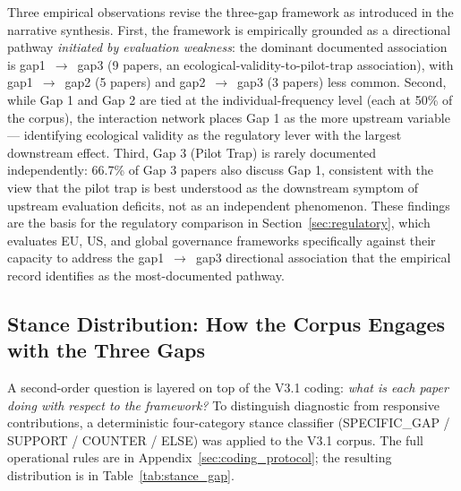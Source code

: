 Three empirical observations revise the three-gap framework as
introduced in the narrative synthesis. First, the framework is
empirically grounded as a directional pathway \textit{initiated by
evaluation weakness}: the dominant documented association is
gap1~$\rightarrow$~gap3 (9 papers, an
ecological-validity-to-pilot-trap association), with
gap1~$\rightarrow$~gap2 (5 papers) and gap2~$\rightarrow$~gap3 (3
papers) less common. Second, while Gap 1 and Gap 2 are tied at the
individual-frequency level (each at 50\% of the corpus), the
interaction network places Gap 1 as the more upstream variable ---
identifying ecological validity as the regulatory lever with the
largest downstream effect. Third, Gap 3 (Pilot Trap)
is rarely documented independently: 66.7\% of Gap 3 papers also
discuss Gap 1, consistent with the view that the pilot trap is best
understood as the downstream symptom of upstream evaluation deficits,
not as an independent phenomenon. These findings are the basis for
the regulatory comparison in Section~\ref{sec:regulatory}, which
evaluates EU, US, and global governance frameworks specifically
against their capacity to address the gap1~$\rightarrow$~gap3
directional association that the empirical record identifies as
the most-documented pathway.


\subsection{Stance Distribution: How the Corpus Engages with the Three Gaps}
\label{sec:stance}

A second-order question is layered on top of the V3.1
coding: \textit{what is each paper doing with respect to
the framework?} To distinguish diagnostic from responsive
contributions, a deterministic four-category stance
classifier (SPECIFIC\_GAP / SUPPORT / COUNTER / ELSE) was
applied to the V3.1 corpus. The full operational rules are
in Appendix~\ref{sec:coding_protocol}; the
resulting distribution is in
Table~\ref{tab:stance_gap}.

